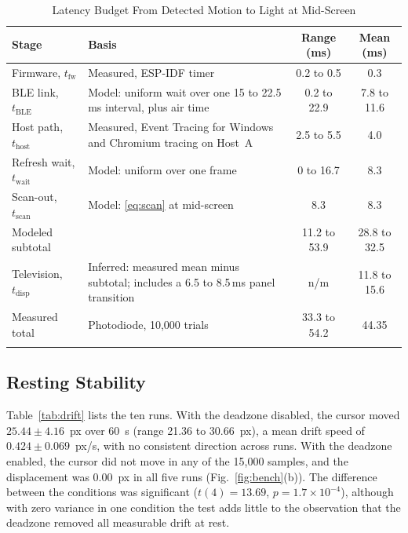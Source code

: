 \documentclass[journal]{IEEEtran}
\begin{document}
\begin{table}[!t]
\caption{Latency Budget From Detected Motion to Light at Mid-Screen}
\label{tab:budget}
\centering
\footnotesize
\setlength{\tabcolsep}{3pt}
\begin{tabular}{@{}>{\raggedright\arraybackslash}p{2.0cm}>{\raggedright\arraybackslash}p{3.15cm}cc@{}}
\toprule
Stage & Basis & Range (ms) & Mean (ms) \\
\midrule
Firmware, $t_{\mathrm{fw}}$ & Measured, ESP-IDF timer & 0.2 to 0.5 & 0.3 \\
BLE link, $t_{\mathrm{BLE}}$ & Model: uniform wait over one 15 to 22.5\,ms interval, plus air time & 0.2 to 22.9 & 7.8 to 11.6 \\
Host path, $t_{\mathrm{host}}$ & Measured, Event Tracing for Windows and Chromium tracing on Host~A & 2.5 to 5.5 & 4.0 \\
Refresh wait, $t_{\mathrm{wait}}$ & Model: uniform over one frame & 0 to 16.7 & 8.3 \\
Scan-out, $t_{\mathrm{scan}}$ & Model: \eqref{eq:scan} at mid-screen & 8.3 & 8.3 \\
\midrule
Modeled subtotal & & 11.2 to 53.9 & 28.8 to 32.5 \\
Television, $t_{\mathrm{disp}}$ & Inferred: measured mean minus subtotal; includes a 6.5 to 8.5\,ms panel transition & n/m & 11.8 to 15.6 \\
\midrule
Measured total & Photodiode, 10,000 trials & 33.3 to 54.2 & 44.35 \\
\bottomrule
\multicolumn{4}{@{}l@{}}{\scriptsize n/m: not measured.}
\end{tabular}
\end{table}

\subsection{Resting Stability}
Table~\ref{tab:drift} lists the ten runs. With the deadzone disabled, the cursor moved $25.44\pm4.16$~px over 60~s (range 21.36 to 30.66~px), a mean drift speed of $0.424\pm0.069$~px/s, with no consistent direction across runs. With the deadzone enabled, the cursor did not move in any of the 15,000 samples, and the displacement was 0.00~px in all five runs (Fig.~\ref{fig:bench}(b)). The difference between the conditions was significant ($t(4)=13.69$, $p=1.7\times10^{-4}$), although with zero variance in one condition the test adds little to the observation that the deadzone removed all measurable drift at rest.
\end{document}
